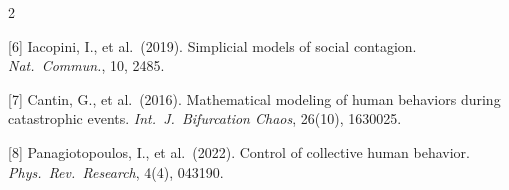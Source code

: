 \documentclass[20pt]{extarticle}
\begin{document}
\begin{multicols}{2}
{[6] Iacopini, I., et al.\ (2019). Simplicial models of social contagion. \textit{Nat.\ Commun.}, 10, 2485.

[7] Cantin, G., et al.\ (2016). Mathematical modeling of human behaviors during catastrophic events. \textit{Int.\ J.\ Bifurcation Chaos}, 26(10), 1630025.

[8] Panagiotopoulos, I., et al.\ (2022). Control of collective human behavior. \textit{Phys.\ Rev.\ Research}, 4(4), 043190.
\par}

\vspace{0.3cm}
\begin{flushright}
\end{flushright}

\end{multicols}
\end{document}
